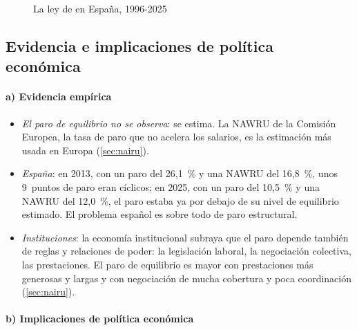 \documentclass[11pt]{article}
\begin{document}
\begin{figure}[H]
\centering
\caption{La ley de  en España, 1996-2025}\label{fig:okun-espana}
\end{figure}

\subsection{Evidencia e implicaciones de política económica}\label{sec:paro-politicas}

\paragraph{a) Evidencia empírica}

\begin{itemize}
\item \emph{El paro de equilibrio no se observa}: se estima. La NAWRU de la Comisión Europea, la tasa de paro que no acelera los salarios, es la estimación más usada en Europa (\ref{sec:nairu}).
\item \emph{España}: en 2013, con un paro del 26,1~\% y una NAWRU del 16,8~\%, unos 9~puntos de paro eran cíclicos; en 2025, con un paro del 10,5~\% y una NAWRU del 12,0~\%, el paro estaba ya por debajo de su nivel de equilibrio estimado\nocite{CE2026AMECO,CE2026AMECOParo}. El problema español es sobre todo de paro estructural.
\item \emph{Instituciones}: la economía institucional subraya que el paro depende también de reglas y relaciones de poder: la legislación laboral, la negociación colectiva, las prestaciones. El paro de equilibrio es mayor con prestaciones más generosas y largas y con negociación de mucha cobertura y poca coordinación\nocite{Nickell1997Unemployment} (\ref{sec:nairu}).
\end{itemize}

\paragraph{b) Implicaciones de política económica}
\end{document}
